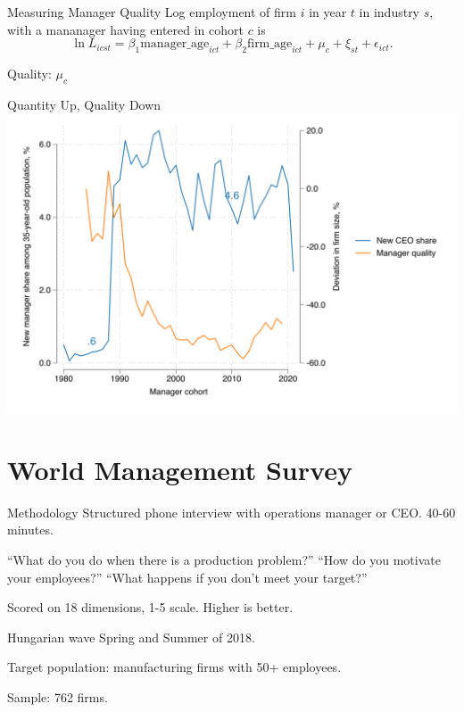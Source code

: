 \documentclass[
  ignorenonframetext,
  aspectratio=1610,
]{beamer}
\begin{document}
\begin{frame}{Measuring Manager Quality}
\protect\hypertarget{measuring-manager-quality}{}
Log employment of firm \(i\) in year \(t\) in industry \(s\), with a
mananager having entered in cohort \(c\) is \[
\ln L_{icst} = \beta_1\text{manager\_age}_{ict} + \beta_2\text{firm\_age}_{ict}  + \mu_{c} + \xi_{st} + \epsilon_{ict}.
\]

Quality: \(\mu_c\)
\end{frame}

\begin{frame}{Quantity Up, Quality Down}
\protect\hypertarget{quantity-up-quality-down}{}
\includegraphics{fig/ceo-flow-with-FE.png}
\end{frame}

\section{World Management Survey}\label{world-management-survey-1}

\begin{frame}{Methodology}
\protect\hypertarget{methodology}{}
Structured phone interview with operations manager or CEO. 40-60
minutes.

``What do you do when there is a production problem?'' ``How do you
motivate your employees?'' ``What happens if you don't meet your
target?''

Scored on 18 dimensions, 1-5 scale. Higher is better.
\end{frame}

\begin{frame}{Hungarian wave}
\protect\hypertarget{hungarian-wave}{}
Spring and Summer of 2018.

Target population: manufacturing firms with 50+ employees.

Sample: 762 firms.
\end{frame}
\end{document}
